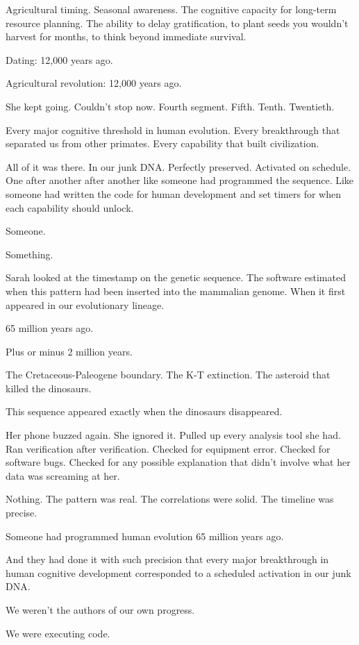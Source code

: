Agricultural timing. Seasonal awareness. The cognitive capacity for long-term resource planning. The ability to delay gratification, to plant seeds you wouldn't harvest for months, to think beyond immediate survival.

Dating: 12,000 years ago.

Agricultural revolution: 12,000 years ago.

She kept going. Couldn't stop now. Fourth segment. Fifth. Tenth. Twentieth.

Every major cognitive threshold in human evolution. Every breakthrough that separated us from other primates. Every capability that built civilization.

All of it was there. In our junk DNA. Perfectly preserved. Activated on schedule. One after another after another like someone had programmed the sequence. Like someone had written the code for human development and set timers for when each capability should unlock.

Someone.

Something.

Sarah looked at the timestamp on the genetic sequence. The software estimated when this pattern had been inserted into the mammalian genome. When it first appeared in our evolutionary lineage.

65 million years ago.

Plus or minus 2 million years.

The Cretaceous-Paleogene boundary. The K-T extinction. The asteroid that killed the dinosaurs.

This sequence appeared exactly when the dinosaurs disappeared.

Her phone buzzed again. She ignored it. Pulled up every analysis tool she had. Ran verification after verification. Checked for equipment error. Checked for software bugs. Checked for any possible explanation that didn't involve what her data was screaming at her.

Nothing. The pattern was real. The correlations were solid. The timeline was precise.

Someone had programmed human evolution 65 million years ago.

And they had done it with such precision that every major breakthrough in human cognitive development corresponded to a scheduled activation in our junk DNA.

We weren't the authors of our own progress.

We were executing code.

